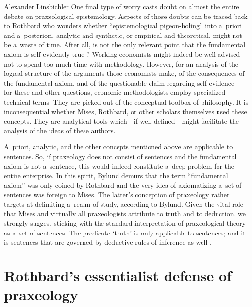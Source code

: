\begin{artengenv}{Alexander Linsbichler}
One final type of worry casts doubt on almost the entire debate on praxeological epistemology. Aspects of those doubts can be traced back to Rothbard who wonders whether ``epistemological pigeon-holing'' into a~priori and a~posteriori, analytic and synthetic, or empirical and theoretical, might not be a~waste of time. After all, is not the only relevant point that the fundamental axiom is self-evidently true 
\parencite[see e.g.][p.318]{rothbard_defense_1957}? %
 Working economists might indeed be well advised not to spend too much time with methodology. However, for an analysis of the logical structure of the arguments those economists make, of the consequences of the fundamental axiom, and of the questionable claim regarding self-evidence---for these and other questions, economic methodologists employ specialized technical terms. They are picked out of the conceptual toolbox of philosophy. It is inconsequential whether Mises, Rothbard, or other scholars themselves used these concepts. They are analytical tools which---if well-defined---might facilitate the analysis of the ideas of these authors.



A~priori, analytic, and the other concepts mentioned above are applicable to sentences. So, if praxeology does not consist of sentences and the fundamental axiom is not a~sentence, this would indeed constitute a~deep problem for the entire enterprise. In this spirit, Bylund 
\parencite*[][]{bylund_alexander_2023} %
 demurs that the term ``fundamental axiom'' was only coined by Rothbard and the very idea of axiomatizing a~set of sentences was foreign to Mises. The latter's conception of praxeology rather targets at delimiting a~realm of study, according to Bylund. Given the vital role that Mises and virtually all praxeologists attribute to truth and to deduction, we strongly suggest sticking with the standard interpretation of praxeological theory as a~set of sentences. The predicate ‘truth' is only applicable to sentences; and it is sentences that are governed by deductive rules of inference as well 
\parencite[][]{linsbichler_ultra-refined_2023}.%




\section{Rothbard's essentialist defense of praxeology}


\end{artengenv}
